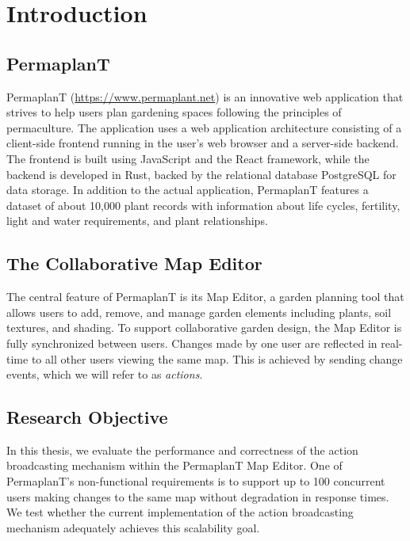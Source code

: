 \documentclass[final,oneside]{vutinfth}
\begin{document}
\mainmatter

\chapter{Introduction}\label{chap:introduction}

\section{PermaplanT}

PermaplanT (\url{https://www.permaplant.net}) is an innovative web application that strives to help users plan gardening spaces following the principles of permaculture.
The application uses a web application architecture consisting of a client-side frontend running in the user's web browser and a server-side backend.
The frontend is built using JavaScript and the React framework, while the backend is developed in Rust, backed by the relational database PostgreSQL for data storage.
In addition to the actual application, PermaplanT features a dataset of about 10,000 plant records with information about life cycles, fertility, light and water requirements, and plant relationships.

\section{The Collaborative Map Editor}

The central feature of PermaplanT is its Map Editor, a garden planning tool that allows users to add, remove, and manage garden elements including plants, soil textures, and shading.
To support collaborative garden design, the Map Editor is fully synchronized between users.
Changes made by one user are reflected in real-time to all other users viewing the same map.
This is achieved by sending change events, which we will refer to as \emph{actions}.

\section{Research Objective}

In this thesis, we evaluate the performance and correctness of the action broadcasting mechanism within the PermaplanT Map Editor.
One of PermaplanT's non-functional requirements is to support up to 100 concurrent users making changes to the same map without degradation in response times.
We test whether the current implementation of the action broadcasting mechanism adequately achieves this scalability goal.
\end{document}
